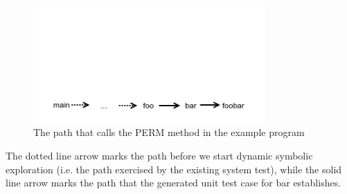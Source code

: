 \documentclass[proposal]{umthesis} %
\begin{document}
\begin{figure}[h]
\centering
\includegraphics[width=3.5in, trim=0in 0in 0in 2.0in, clip]{path.png}
\caption{The path that calls the PERM method in the example program}
\end{figure}

The dotted line arrow marks the path before we start dynamic symbolic exploration (i.e. the path exercised by the existing system test), while the solid line arrow marks the path that the generated unit test case for bar establishes. 
\end{document}
